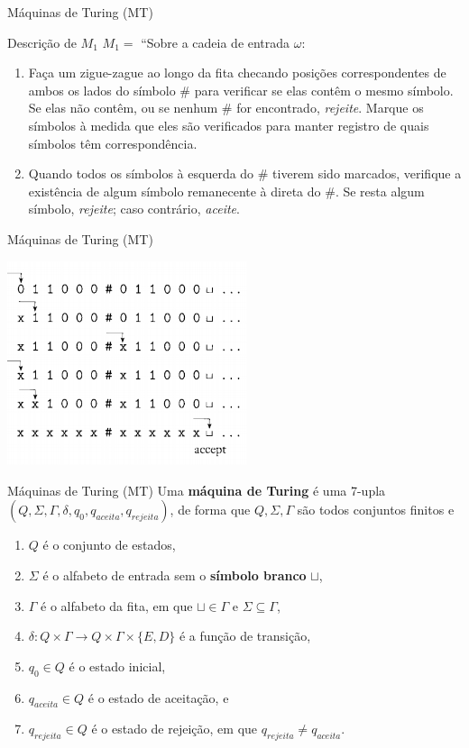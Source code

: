 \documentclass[xcolor=dvipsnames,table]{beamer}
\begin{document}
	\begin{frame}{Máquinas de Turing (MT)}
		\begin{block}{Descrição de $M_1$}
			$M_1 =$ ``Sobre a cadeia de entrada $\omega$:
			\begin{enumerate}
				\item Faça um zigue-zague ao longo da fita checando posições correspondentes de ambos os lados do símbolo $\#$ para verificar se elas contêm o mesmo símbolo. Se elas não contêm, ou se nenhum $\#$ for encontrado, {\it rejeite}. Marque os símbolos à medida que eles são verificados para manter registro de quais símbolos têm correspondência.
				\item Quando todos os símbolos à esquerda do $\#$ tiverem sido marcados, verifique a existência de algum símbolo remanecente à direta do $\#$. Se resta algum símbolo, {\it rejeite}; caso contrário, {\it aceite}.
			\end{enumerate}
		\end{block}
	\end{frame}
	
	\begin{frame}{Máquinas de Turing (MT)}
		\begin{center}
			\includegraphics[height=6cm]{images/fig32.png}
		\end{center}
	\end{frame}	
	
	\begin{frame}{Máquinas de Turing (MT)}
		Uma {\bf máquina de Turing} é uma 7-upla $(Q, \Sigma, \Gamma, \delta, q_0, q_{aceita}, q_{rejeita})$, de forma que $Q, \Sigma, \Gamma$ são todos conjuntos finitos e
		
		\begin{enumerate}
			\item $Q$ é o conjunto de estados,
			\item $\Sigma$ é o alfabeto de entrada sem o {\bf símbolo branco} $\sqcup$,
			\item $\Gamma$ é o alfabeto da fita, em que $\sqcup \in \Gamma$ e $\Sigma \subseteq \Gamma$,
			\item $\delta : Q \times \Gamma \rightarrow Q \times \Gamma \times \{E, D\}$ é a função de transição,
			\item $q_0 \in Q$ é o estado inicial,
			\item $q_{aceita} \in Q$ é o estado de aceitação, e
			\item $q_{rejeita} \in Q$ é o estado de rejeição, em que $q_{rejeita} \not= q_{aceita}$.
		\end{enumerate}
	\end{frame}
	
	\begin{frame}
		\titlepage
	\end{frame}
	
\end{document}
